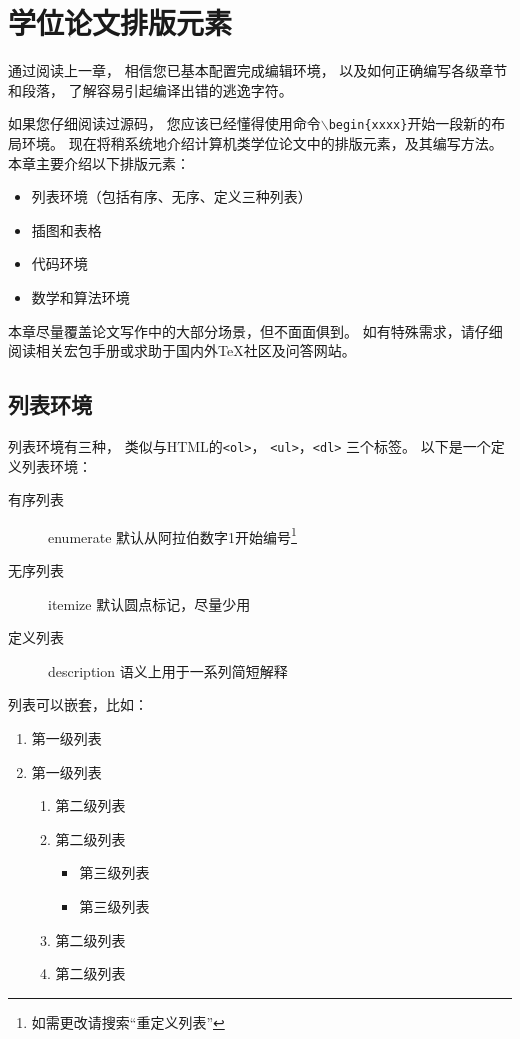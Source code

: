
\chapter{学位论文排版元素}

通过阅读上一章，
相信您已基本配置完成编辑环境，
以及如何正确编写各级章节和段落，
了解容易引起编译出错的逃逸字符。

如果您仔细阅读过源码，
您应该已经懂得使用命令\texttt{$\backslash$begin\{xxxx\}}开始一段新的布局环境。
现在将稍系统地介绍计算机类学位论文中的排版元素，及其编写方法。
本章主要介绍以下排版元素：
\begin{itemize}
    \item 列表环境（包括有序、无序、定义三种列表）
    \item 插图和表格
    \item 代码环境
    \item 数学和算法环境
\end{itemize}

本章尽量覆盖论文写作中的大部分场景，但不面面俱到。
如有特殊需求，请仔细阅读相关宏包手册或求助于国内外TeX社区及问答网站。

\section{列表环境}

列表环境有三种，
类似与HTML的\texttt{<ol>}，
\texttt{<ul>}，\texttt{<dl>}
三个标签。
以下是一个定义列表环境：
\begin{description}
    \item[有序列表] enumerate 默认从阿拉伯数字1开始编号\footnote{如需更改请搜索“重定义列表”}
    \item[无序列表] itemize 默认圆点标记，尽量少用
    \item[定义列表] description 语义上用于一系列简短解释
\end{description}

列表可以嵌套，比如：
\begin{enumerate}
	\item 第一级列表
	\item 第一级列表
	\begin{enumerate}
		\item 第二级列表
		\item 第二级列表
        \begin{itemize}
            \item 第三级列表
            \item 第三级列表
		\end{itemize}
		\item 第二级列表
		\item 第二级列表
	\end{enumerate}
\end{enumerate}

